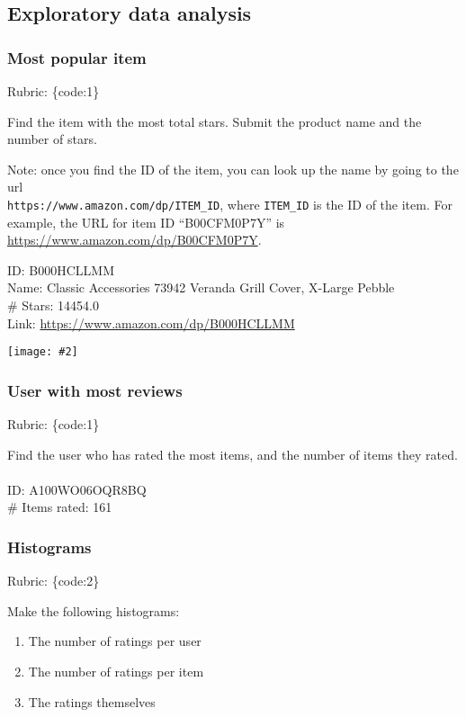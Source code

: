\documentclass{article}
\def\rubric#1{\gre{Rubric: \{#1\}}}{}
\def\blu#1{{\color{blu}#1}}
\def\gre#1{{\color{gre}#1}}
\def\ans#1{{\color{ans}#1}}
\newcommand{\centerfig}[2]{\begin{center}\texttt{[image: \#2]}\end{center}}
\begin{document}
\subsection{Exploratory data analysis}

\subsubsection{Most popular item}
\rubric{code:1}

Find the item with the most total stars. \blu{Submit the product name and the number of stars}.

Note: once you find the ID of the item, you can look up the name by going to the url \\ \verb|https://www.amazon.com/dp/ITEM_ID|, where \verb|ITEM_ID| is the ID of the item.
For example, the URL for item ID ``B00CFM0P7Y'' is \url{https://www.amazon.com/dp/B00CFM0P7Y}. 

\ans{
    ID: B000HCLLMM\\
    Name: Classic Accessories 73942 Veranda Grill Cover, X-Large Pebble \\
    \# Stars: 14454.0 \\
    Link: \url{https://www.amazon.com/dp/B000HCLLMM} \\
}
\centerfig{1}{../figs/B000HCLLMM}

\subsubsection{User with most reviews}
\rubric{code:1}

\blu{Find the user who has rated the most items, and the number of items they rated.} \\ \\
\ans{
    ID: A100WO06OQR8BQ\\
    \# Items rated: 161 \\
}

\subsubsection{Histograms}
\rubric{code:2}

\blu{Make the following histograms:}
\begin{enumerate}
\item The number of ratings per user
\item The number of ratings per item
\item The ratings themselves
\end{enumerate}
\end{document}
